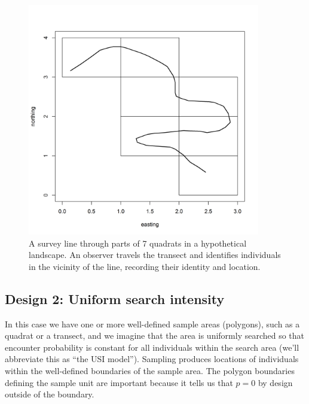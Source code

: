 \begin{figure}
\centering
\includegraphics[width=4in,height=4in]{Ch15-searchencounter/figs/snakeline.png}
\caption{
A survey line through parts of 7 quadrats in a
  hypothetical landscape. An observer travels the transect and
  identifies individuals in the vicinity of the line, recording their
  identity and location.
}
\label{searchencounter.fig.snakeline}
\end{figure}


\subsection{Design 2: Uniform search intensity}

In this case we have one or more well-defined sample areas (polygons),
such as a quadrat or a transect, and we imagine that the area is
uniformly searched 
so that encounter probability is constant for all
individuals within the search area
(we'll abbreviate this as ``the USI model'').
 Sampling produces locations of
individuals within the well-defined boundaries of the sample area. The
polygon boundaries defining the sample unit are important because it
tells us that $p=0$ by design outside of the boundary.


